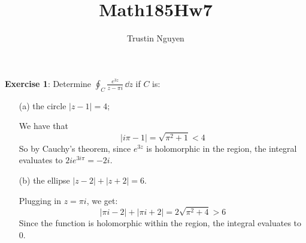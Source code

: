 \documentclass{article}
\title{Math185Hw7}
\author{Trustin Nguyen}
\begin{document}
    \maketitle

\reversemarginpar

\textbf{Exercise 1}: Determine $\oint_{C}^{} \frac{e^{3z}}{z - \pi i} \, \dd{z} $ if $C$ is:
    \begin{itemize}
        \item [(a)] the circle $\lvert z - 1 \rvert = 4$;
            \begin{answer}
                We have that 
                    \begin{equation*}
                        \lvert i\pi - 1 \rvert = \sqrt{\pi^{2} + 1} < 4
                    \end{equation*}
                So by Cauchy's theorem, since $e^{3z}$ is holomorphic in the region, the integral evaluates to $2i e^{3i \pi} = -2i$.
            \end{answer}

        \item [(b)] the ellipse $\lvert z - 2 \rvert + \lvert z + 2 \rvert = 6$. 
            \begin{answer}
                Plugging in $z = \pi i$, we get:
                    \begin{equation*}
                        \lvert \pi i - 2 \rvert + \lvert \pi i + 2 \rvert = 2\sqrt{\pi^{2} + 4} > 6
                    \end{equation*}
                Since the function is holomorphic within the region, the integral evaluates to $0$. 
            \end{answer}
    \end{itemize}

\newpage
\end{document}
